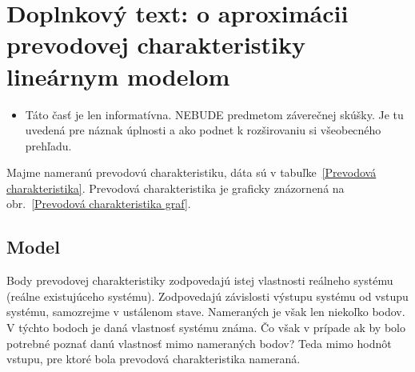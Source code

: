 \documentclass[a4paper, 10pt, ]{article}
\begin{document}
%
%
%
%
%
%


%
%
%
%





















\section{Doplnkový text: o aproximácii prevodovej charakteristiky lineárnym modelom}




\begin{itemize}[leftmargin=0pt, labelsep=4mm, itemsep=0pt]
    \color{Blue}

    \item Táto časť je len informatívna. NEBUDE predmetom záverečnej skúšky. Je tu uvedená pre náznak úplnosti a ako podnet k rozširovaniu si všeobecného prehľadu.

\end{itemize}


\noindent
Majme nameranú prevodovú charakteristiku, dáta sú v tabuľke~\ref{Prevodová charakteristika}. Prevodová charakteristika je graficky znázornená na obr.~\ref{Prevodová charakteristika graf}.



\subsection{Model}

Body prevodovej charakteristiky zodpovedajú istej vlastnosti reálneho systému (reálne existujúceho systému). Zodpovedajú závislosti výstupu systému od vstupu systému, samozrejme v ustálenom stave. Nameraných je však len niekoľko bodov. V týchto bodoch je daná vlastnosť systému známa. Čo však v prípade ak by bolo potrebné poznať danú vlastnosť mimo nameraných bodov? Teda mimo hodnôt vstupu, pre ktoré bola prevodová charakteristika nameraná.
\end{document}
